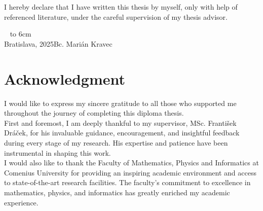 \documentclass[12pt, twoside, openany]{book}
\def\mfauthor{Bc. Marián Kravec}
\def\mfskolitel{MSc. František Dráček}
\def\mfplacedate{Bratislava, 2025}
\begin{document}





{~}\vspace{12cm}

\noindent
\begin{minipage}{0.25\textwidth}~\end{minipage}
\thispagestyle{empty}
\begin{minipage}{0.75\textwidth}
I hereby declare that I have written this thesis by myself, only with help of referenced literature, under the careful supervision of my thesis advisor.
\newline \newline
\end{minipage}
\vfill
~ \hfill {\hbox to 6cm{\dotfill}} \\
\mfplacedate \hfill \mfauthor
\vfill\eject \cleardoublepage




\newpage
\thispagestyle{empty}
\chapter*{Acknowledgment}\label{chap:thank_you}

I would like to express my sincere gratitude to all those who supported me throughout the journey of completing this diploma thesis.
\\

First and foremost, I am deeply thankful to my supervisor, \mfskolitel, for his invaluable guidance, encouragement, and insightful feedback during every stage of my research. His expertise and patience have been instrumental in shaping this work.
\\

I would also like to thank the Faculty of Mathematics, Physics and Informatics at Comenius University for providing an inspiring academic environment and access to state-of-the-art research facilities. The faculty’s commitment to excellence in mathematics, physics, and informatics has greatly enriched my academic experience.
\\
\end{document}
